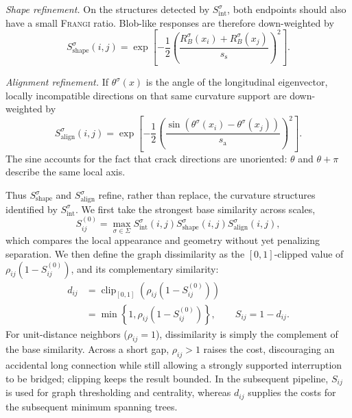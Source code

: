 \documentclass[conference,a4paper]{IEEEtran}
\newcommand{\Frangi}{\textnormal{\textsc{Frangi}}}
\begin{document}
\emph{Shape refinement.} On the structures detected by $S_{\mathrm{int}}^\sigma$, both endpoints should also have a small \Frangi{} ratio. Blob-like responses are therefore down-weighted by
\begin{equation}
S_{\mathrm{shape}}^\sigma(i,j)=
\exp\left[-\frac12\left(\frac{R_B^\sigma(x_i)+R_B^\sigma(x_j)}{s_{\mathrm{s}}}\right)^2\right].
\end{equation}

\emph{Alignment refinement.} If $\theta^\sigma(x)$ is the angle of the longitudinal eigenvector, locally incompatible directions on that same curvature support are down-weighted by
\begin{equation}
S_{\mathrm{align}}^\sigma(i,j)=
\exp\left[-\frac12\left(\frac{\sin(\theta^\sigma(x_i)-\theta^\sigma(x_j))}{s_{\mathrm{a}}}\right)^2\right].
\end{equation}
The sine accounts for the fact that crack directions are unoriented: $\theta$ and $\theta+\pi$ describe the same local axis.

Thus $S_{\mathrm{shape}}^\sigma$ and $S_{\mathrm{align}}^\sigma$ refine, rather than replace, the curvature structures identified by $S_{\mathrm{int}}^\sigma$. We first take the strongest base similarity across scales,
\begin{equation}
S_{ij}^{(0)}=\max_{\sigma\in\Sigma}
S_{\mathrm{int}}^\sigma(i,j)
S_{\mathrm{shape}}^\sigma(i,j)
S_{\mathrm{align}}^\sigma(i,j),
\end{equation}
which compares the local appearance and geometry without yet penalizing separation. We then define the graph dissimilarity as the $[0,1]$-clipped value of $\rho_{ij}(1-S_{ij}^{(0)})$, and its complementary similarity:
\begin{equation}
\begin{aligned}
    d_{ij}
    &=\operatorname{clip}_{[0,1]}\!\left(\rho_{ij}(1-S_{ij}^{(0)})\right)\\
    &=\min\!\left\{1,\rho_{ij}(1-S_{ij}^{(0)})\right\},
    \qquad S_{ij}=1-d_{ij}.
\end{aligned}
\label{eq:distance}
\end{equation}
For unit-distance neighbors ($\rho_{ij}=1$), dissimilarity is simply the complement of the base similarity. Across a short gap, $\rho_{ij}>1$ raises the cost, discouraging an accidental long connection while still allowing a strongly supported interruption to be bridged; clipping keeps the result bounded. In the subsequent pipeline, $S_{ij}$ is used for graph thresholding and centrality, whereas $d_{ij}$ supplies the costs for the subsequent minimum spanning trees.
\end{document}
